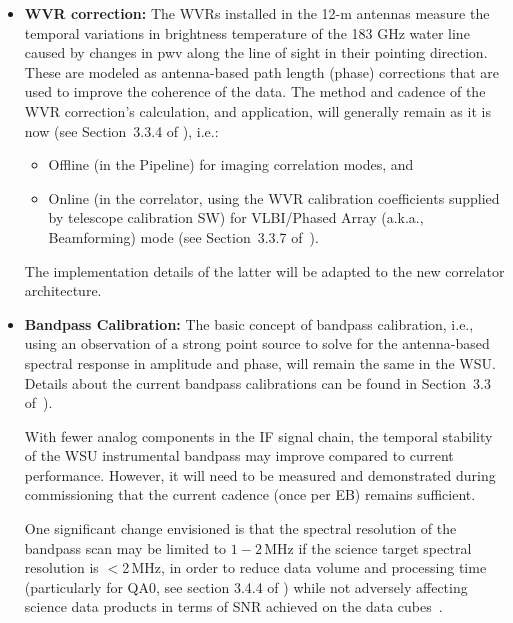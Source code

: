 \begin{itemize}[itemsep=-0.5em]
\item {\bf \ac{WVR} correction:} 
The \acp{WVR} installed in the 12-m antennas measure the temporal variations in brightness temperature of the 183 GHz water line caused by changes in \ac{pwv} along the line of sight in their pointing direction. These are modeled as antenna-based path length (phase) corrections that are used to improve the coherence of the data.
The method and cadence of the \ac{WVR} correction's calculation, and application, will generally remain as it is now (see Section~3.3.4 of \cite{CSA-IA}), i.e.:
\begin{itemize}[itemsep=-0.5em]
\item Offline (in the Pipeline) for imaging correlation modes, and 
\item Online (in the correlator, using the WVR calibration coefficients supplied by telescope calibration SW) for VLBI/Phased Array (a.k.a., Beamforming) mode (see 
Section~3.3.7 of~\cite{CSA-IA}).
\end{itemize}

The implementation details of the latter will be adapted to the new correlator architecture. 
\item{\bf Bandpass Calibration:} 
The basic concept of bandpass calibration, i.e., using an observation of a strong point source to solve for the antenna-based spectral response in amplitude and phase, will 
remain the same in the WSU. Details about the current bandpass calibrations can be found in Section~3.3 of~\cite{CSA-IA}). 

With fewer analog components in the IF signal chain, the temporal stability of the WSU instrumental bandpass may
improve compared to current performance. However, it will need to be measured and demonstrated  during commissioning that the current cadence (once per \ac{EB}) remains sufficient. 

One significant change envisioned is that the spectral resolution of the bandpass scan may be limited to $1-2$\,MHz if the science target spectral resolution is $<$2\,MHz, in order to
reduce data volume and processing time (particularly for QA0, see section 3.4.4 of \cite{da}) while not adversely affecting science data products in terms of \ac{SNR} achieved on the data cubes~\cite{bandpassMemo}. 


\end{itemize}
